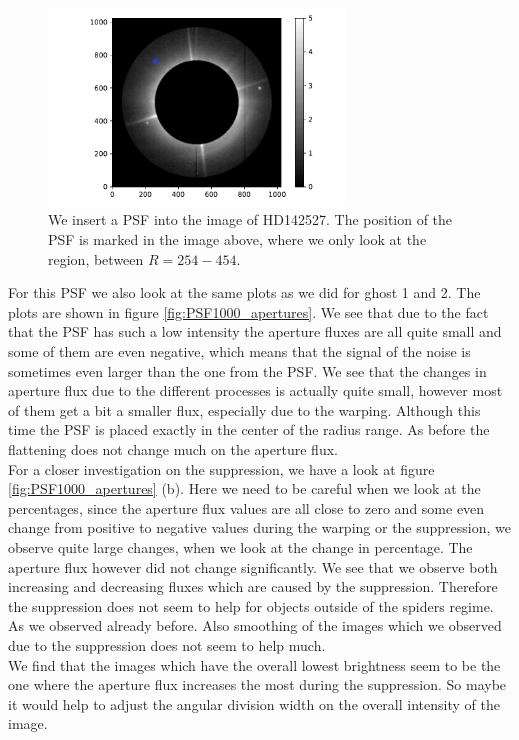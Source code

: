\begin{figure}[H]
	\centering
		\includegraphics[width=0.7\textwidth]{pics/HDimg_PSF.pdf}
		\caption{We insert a PSF into the image of HD142527. The position of the PSF is marked in the image above, where we only look at the region, between $R=254-454$.}
		\label{fig:HDimg_PSF}
\end{figure}
For this PSF we also look at the same plots as we did for ghost 1 and 2. The plots are shown in figure \ref{fig:PSF1000_apertures}. We see that due to the fact that the PSF has such a low intensity the aperture fluxes are all quite small and some of them are even negative, which means that the signal of the noise is sometimes even larger than the one from the PSF. We see that the changes in aperture flux due to the different processes is actually quite small, however most of them get a bit a smaller flux, especially due to the warping. Although this time the PSF is placed exactly in the center of the radius range. As before the flattening does not change much on the aperture flux.\\
For a closer investigation on the suppression, we have a look at figure \ref{fig:PSF1000_apertures} (b). Here we need to be careful when we look at the percentages, since the aperture flux values are all close to zero and some even change from positive to negative values during the warping or the suppression, we observe quite large changes, when we look at the change in percentage. The aperture flux however did not change significantly. We see that we observe both increasing and decreasing fluxes which are caused by the suppression. Therefore the suppression does not seem to help for objects outside of the spiders regime. As we observed already before. Also smoothing of the images which we observed due to the suppression does not seem to help much. \\
We find that the images which have the overall lowest brightness seem to be the one where the aperture flux increases the most during the suppression. So maybe it would help to adjust the angular division width on the overall intensity of the image. \\
